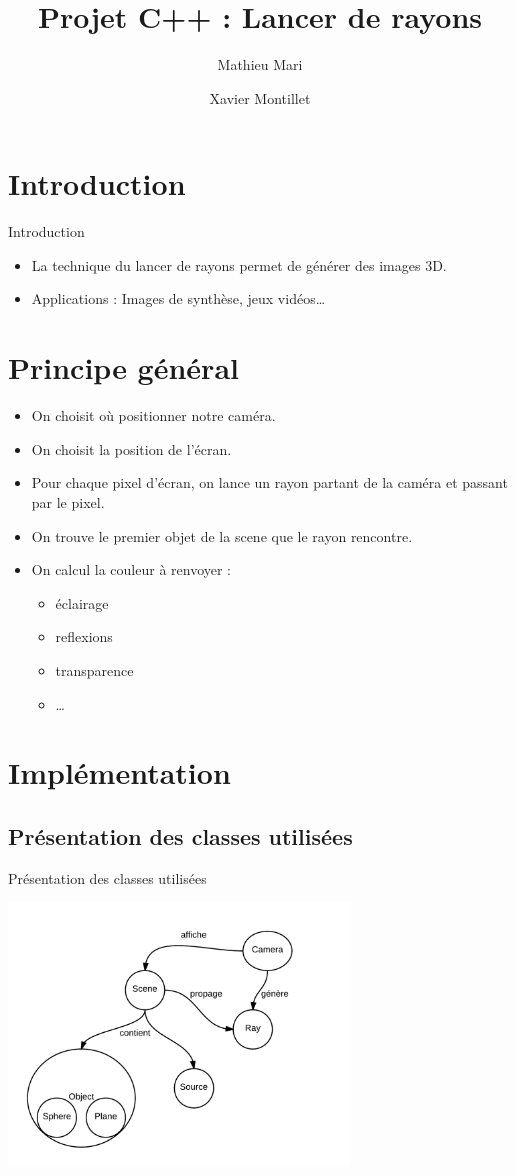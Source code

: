 \documentclass{beamer}
\title{Projet C++ : Lancer de rayons}
\author{Mathieu Mari \and Xavier Montillet}
\begin{document}
\begin{frame}
	\titlepage
\end{frame}
	
\section{Introduction}
	\begin{frame}{Introduction}
		\begin{itemize}
			\item La technique du lancer de rayons permet de générer des images 3D.
			\item Applications : Images de synthèse, jeux vidéos\dots
		\end{itemize}
	\end{frame}
\section{Principe général}
	\begin{frame}
	\begin{itemize}
		\item On choisit où positionner notre caméra.
		\item On choisit la position de l'écran.
		\item Pour chaque pixel d'écran, on lance un rayon partant de la caméra et passant par le pixel.
		\item On trouve le premier objet de la scene que le rayon rencontre.
		\item On calcul la couleur à renvoyer : 
			\begin{itemize}	
				\item éclairage
				\item reflexions
				\item transparence	
				\item \dots
			\end{itemize}		
	\end{itemize}

	\end{frame}
	
\section{Implémentation}
	\subsection{Présentation des classes utilisées}
	\begin{frame}{Présentation des classes utilisées}
		\begin{center}
    		\includegraphics[height = 7cm]{schema.png}
  		\end{center}
	\end{frame}	
		
	
\end{document}
